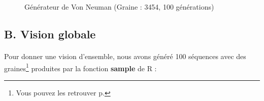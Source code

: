 \documentclass[
]{article}
\begin{document}
\begin{figure}

{\centering {}

}

\caption{Générateur de Von Neuman (Graine : 3454, 100 générations)}\label{fig:unnamed-chunk-5}
\end{figure}

\clearpage

\subsection*{B. Vision globale}

\paragraph{}

Pour donner une vision d'ensemble, nous avons généré 100 séquences avec
des
graines\footnote{Vous pouvez les retrouver p. \pageref{part:annexes}}
produites par la fonction \textbf{sample} de R :
\end{document}
